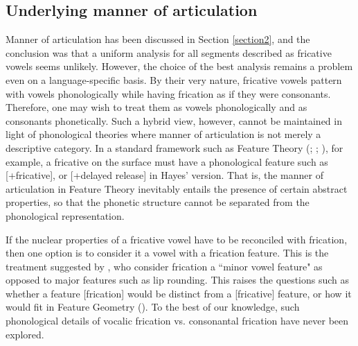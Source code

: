 \documentclass[output=paper,colorlinks,citecolor=brown,chinesefont]{langscibook}
\begin{document}
\subsection{Underlying manner of articulation} \label{section:MOA}
Manner of articulation has been discussed in Section \ref{section2}, and the conclusion was that a uniform analysis for all segments described as fricative vowels seems unlikely. However, the choice of the best analysis remains a problem even on a language-specific basis. By their very nature, fricative vowels pattern with vowels phonologically while having frication as if they were consonants. Therefore, one may wish to treat them as vowels phonologically and as consonants phonetically. Such a hybrid view, however, cannot be maintained in light of phonological theories where manner of articulation is not merely a descriptive category. In a standard framework such as Feature Theory (\cite{Clements_1985}; \cite{Hayes_2009}; \cite{Lahiri_2018}), for example, a fricative on the surface must have a phonological feature such as [+fricative], or [+delayed release] in Hayes' version. That is, the manner of articulation in Feature Theory inevitably entails the presence of certain abstract properties, so that the phonetic structure cannot be separated from the phonological representation.

If the nuclear properties of a fricative vowel have to be reconciled with frication, then one option is to consider it a vowel with a frication feature. This is the treatment suggested by \citet{Ladefoged&Maddieson_1990}, who consider frication a ``minor vowel feature" as opposed to major features such as lip rounding. This raises the questions such as whether a feature [frication] would be distinct from a [fricative] feature, or how it would fit in Feature Geometry (\cite{Clements_1985}). To the best of our knowledge, such phonological details of vocalic frication vs. consonantal frication have never been explored.
\end{document}
